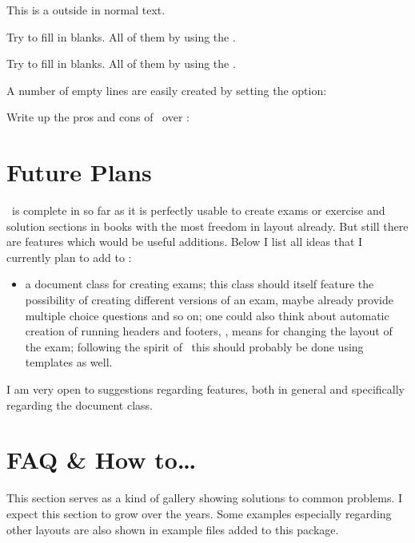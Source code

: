 \documentclass{xsim-manual}
\begin{document}
\begin{example}
  This is a  outside in normal text.
  \begin{exercise}
    Try to fill in  blanks.  All of them
     by using the  .
  \end{exercise}
  \begin{solution}[print]
    Try to fill in  blanks.  All of them
     by using the  .
  \end{solution}
\end{example}
A number of empty lines are easily created by setting the 
option:
\begin{example}
  Write up the pros and cons of \xsim\ over :
  
  \blank[width=4.8\linewidth,linespread=1.5]{}
\end{example}

\edef\lastsection{\arabic{section}}

\appendix

\section{Future Plans}

\xsim\ is complete in so far as it is perfectly usable to create exams or
exercise and solution sections in books with the most freedom in layout
already.  But still there are features which would be useful additions.  Below
I list all ideas that I currently plan to add to \xsim:
\begin{itemize}
  \item a document class  for creating exams; this class
    should itself feature the possibility of creating different versions of an
    exam, maybe already provide multiple choice questions and so on; one could
    also think about automatic creation of running headers and footers, \ie,
    means for changing the layout of the exam; following the spirit of \xsim\
    this should probably be done using templates as well.
\end{itemize}
I am very open to suggestions regarding features, both in general and
specifically regarding the document class.

\section{FAQ \& How to\dots}
This section serves as a kind of gallery showing solutions to common
problems.  I expect this section to grow over the years.  Some examples
especially regarding other layouts are also shown in example files added to
this package.
\end{document}

